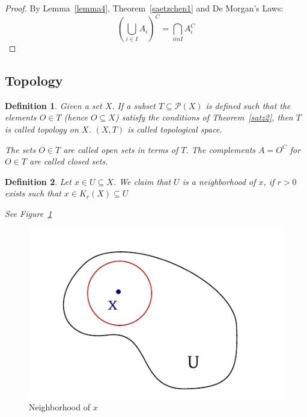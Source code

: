 \documentclass{article}
\newtheorem{definition}{Definition}  \numberwithin{definition}{section}
\begin{document}
\begin{proof}
  By Lemma~\ref{lemma4}, Theorem~\ref{saetzchen1} and De Morgan's Laws:
  \[ \left(\bigcup_{i \in I} A_i\right)^C = \bigcap_{i in I} A_i^C \]
\end{proof}

\subsection{Topology}

\begin{definition}
  Given a set $X$. If a subset $T \subseteq \mathcal P(X)$ is defined
  such that the elements $O \in T$ (hence $O \subseteq X$) satisfy the conditions of Theorem~\ref{satz2},
  then $T$ is called \emph{topology on $X$}.
  $(X, T)$ is called topological space.

  The sets $O \in T$ are called \emph{open sets} in terms of $T$.
  The complements $A = O^C$ for $O \in T$ are called \emph{closed sets}.
\end{definition}

\begin{definition}
  Let $x \in U \subseteq X$. We claim that $U$ is a neighborhood of $x$,
  if $r > 0$ exists such that $x \in K_r(X) \subseteq U$

  See Figure~\ref{img:neigh}
\end{definition}

\begin{figure}
  \begin{center}
    \includegraphics{img/06_neighborhood.pdf}
    \caption{Neighborhood of $x$}
    \label{img:neigh}
  \end{center}
\end{figure}
\end{document}
